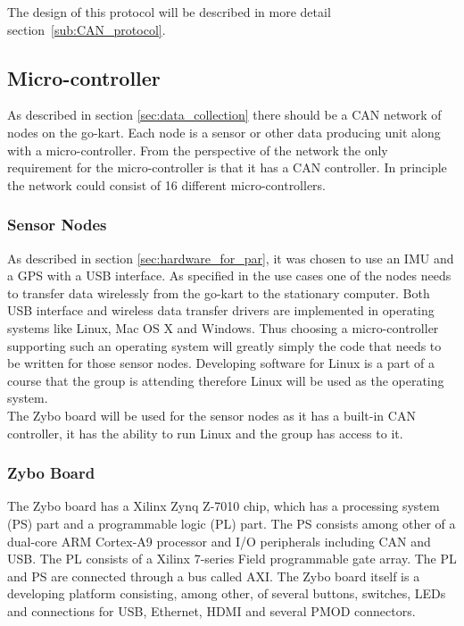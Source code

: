 The design of this protocol will be described in more detail section~\ref{sub:CAN_protocol}.\\








\subsection{Micro-controller}
As described in section \ref{sec:data_collection} there should be a CAN network of nodes on the go-kart.
Each node is a sensor or other data producing unit along with a micro-controller.
From the perspective of the network the only requirement for the micro-controller is that it has a CAN controller.
In principle the network could consist of 16 different micro-controllers.

\subsubsection*{Sensor Nodes}
As described in section \ref{sec:hardware_for_par}, it was chosen to use an IMU and a GPS with a USB interface. 
As specified in the use cases one of the nodes needs to transfer data wirelessly from the go-kart to the stationary computer. 
Both USB interface and wireless data transfer drivers are implemented in operating systems like Linux, Mac OS X and Windows.
Thus choosing a micro-controller supporting such an operating system will greatly simply the code that needs to be written for those sensor nodes.
Developing software for Linux is a part of a course that the group is attending therefore Linux will be used as the operating system.
\\
The Zybo board will be used for the sensor nodes as it has a built-in CAN controller, it has the ability to run Linux and the group has access to it.

\subsubsection*{Zybo Board}
The Zybo board has a Xilinx Zynq Z-7010 chip, which has a processing system (PS) part and a programmable logic (PL) part.
The PS consists among other of a dual-core ARM Cortex-A9 processor and I/O peripherals including CAN and USB.
The PL consists of a Xilinx 7-series Field programmable gate array. 
The PL and PS are connected through a bus called AXI.
The Zybo board itself is a developing platform consisting, among other, of several buttons, switches, LEDs and connections for USB, Ethernet, HDMI and several PMOD connectors.


